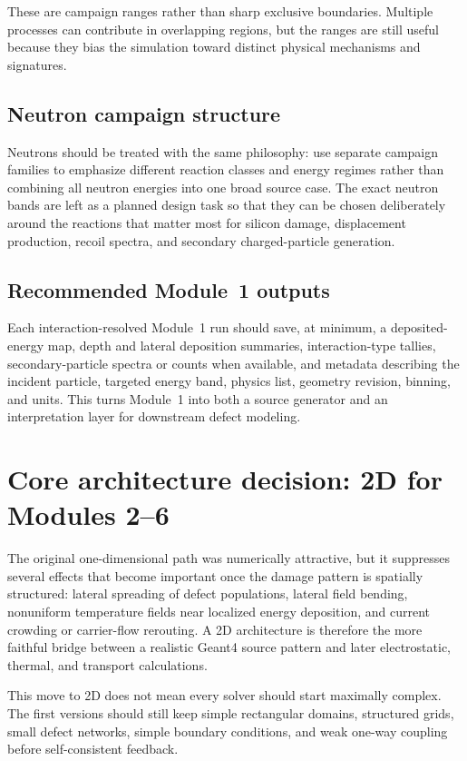 \documentclass[11pt]{article}
\begin{document}
These are campaign ranges rather than sharp exclusive boundaries. Multiple processes can contribute in overlapping regions, but the ranges are still useful because they bias the simulation toward distinct physical mechanisms and signatures.

\subsection{Neutron campaign structure}
Neutrons should be treated with the same philosophy: use separate campaign families to emphasize different reaction classes and energy regimes rather than combining all neutron energies into one broad source case. The exact neutron bands are left as a planned design task so that they can be chosen deliberately around the reactions that matter most for silicon damage, displacement production, recoil spectra, and secondary charged-particle generation.

\subsection{Recommended Module~1 outputs}
Each interaction-resolved Module~1 run should save, at minimum, a deposited-energy map, depth and lateral deposition summaries, interaction-type tallies, secondary-particle spectra or counts when available, and metadata describing the incident particle, targeted energy band, physics list, geometry revision, binning, and units. This turns Module~1 into both a source generator and an interpretation layer for downstream defect modeling.

\section{Core architecture decision: 2D for Modules 2--6}
The original one-dimensional path was numerically attractive, but it suppresses several effects that become important once the damage pattern is spatially structured: lateral spreading of defect populations, lateral field bending, nonuniform temperature fields near localized energy deposition, and current crowding or carrier-flow rerouting. A 2D architecture is therefore the more faithful bridge between a realistic Geant4 source pattern and later electrostatic, thermal, and transport calculations.

This move to 2D does not mean every solver should start maximally complex. The first versions should still keep simple rectangular domains, structured grids, small defect networks, simple boundary conditions, and weak one-way coupling before self-consistent feedback.
\end{document}
